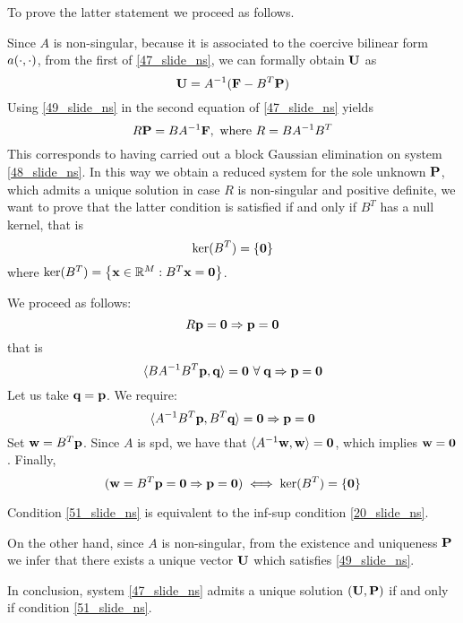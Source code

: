 To prove the latter statement we proceed as follows. 

Since \(A\) is non-singular, because it is associated to the coercive bilinear form \(a(\cdot, \cdot)\), from the first of \eqref{47_slide_ns}, we can formally obtain \(\textbf{U}\) as 
\begin{equation}
    \textbf{U} = A^{-1}(\textbf{F} - B^T\textbf{P})
    \label{49_slide_ns}
\end{equation}
Using \eqref{49_slide_ns} in the second equation of \eqref{47_slide_ns} yields
\begin{equation}
    R\textbf{P} = BA^{-1}\textbf{F}, \text{ where } R=BA^{-1}B^T 
    \label{50_slide_ns}
\end{equation}
This corresponds to having carried out a block Gaussian elimination on system \eqref{48_slide_ns}.
In this way we obtain a reduced system for the sole unknown \(\textbf{P}\), which admits a unique solution in case \(R\) is non-singular and positive definite, we want to prove that the latter condition is satisfied if and only if \(B^T\) has a null kernel, that is 
\begin{equation}
    \ker (B^T) = \left\{ \textbf{0} \right\}
    \label{51_slide_ns}
\end{equation}
where \(\ker (B^T) = \left\{ \textbf{x} \in \mathbb{R}^M : B^T \textbf{x} = \textbf{0} \right\}\). 

We proceed as follows: 
\[
    R\textbf{p} = \textbf{0} \Rightarrow \textbf{p} = \textbf{0}
\]
that is 
\[
    \langle BA^{-1}B^T\textbf{p},\textbf{q} \rangle = \textbf{0} \ \forall \; \textbf{q} \Rightarrow \textbf{p} = \textbf{0}
\]
Let us take \(\textbf{q} = \textbf{p}\). We require:
\[
    \langle A^{-1}B^T \textbf{p},B^T\textbf{q} \rangle = \textbf{0} \Rightarrow \textbf{p} = \textbf{0}
\]
Set \(\textbf{w} = B^T \textbf{p}\). Since \(A\) is spd, we have that \(\langle A^{-1}\textbf{w},\textbf{w} \rangle = \textbf{0}\), which implies \(\textbf{w} = \textbf{0}\). Finally,
\[
    (\textbf{w} = B^T \textbf{p} = \textbf{0} \Rightarrow \textbf{p} = \textbf{0}) \iff \ker (B^T) =  \left\{ \textbf{0} \right\}
\]
\begin{remark}
    Condition \eqref{51_slide_ns} is equivalent to the inf-sup condition \eqref{20_slide_ns}.
\end{remark}
On the other hand, since \(A\) is non-singular, from the existence and uniqueness \(\textbf{P}\) we infer that there exists a unique vector \(\textbf{U}\) which satisfies \eqref{49_slide_ns}. 

In conclusion, system \eqref{47_slide_ns} admits a unique solution \((\textbf{U}, \textbf{P})\) if and only if condition \eqref{51_slide_ns}. 

